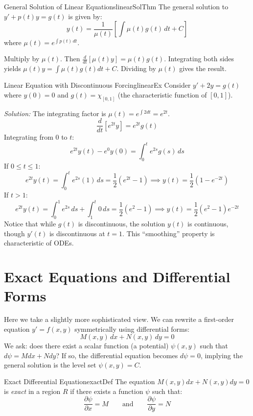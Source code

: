 \documentclass{book}
\newenvironment{Proof}[1][]
  {\begin{ProofTcb}[#1]}
  {\end{ProofTcb}}
\begin{document}
\begin{thm}{General Solution of Linear Equations}{linearSolThm}
    The general solution to $y' + p(t)y = g(t)$ is given by:
    \[
        y(t) = \frac{1}{\mu(t)} \left[ \int \mu(t)g(t) \, dt + C \right]
    \]
    where $\mu(t) = e^{\int p(t) \, dt}$.
\end{thm}

\begin{Proof}
    Multiply by $\mu(t)$. Then $\frac{d}{dt}[\mu(t)y] = \mu(t)g(t)$. Integrating both sides yields $\mu(t)y = \int \mu(t)g(t) dt + C$. Dividing by $\mu(t)$ gives the result.
\end{Proof}

\begin{example}{Linear Equation with Discontinuous Forcing}{linearEx}
    Consider $y' + 2y = g(t)$ where $y(0)=0$ and $g(t) = \chi_{[0,1]}$ (the characteristic function of $[0,1]$).

    \emph{Solution:}
    The integrating factor is $\mu(t) = e^{\int 2 dt} = e^{2t}$.
    \[
        \frac{d}{dt}[e^{2t}y] = e^{2t}g(t)
    \]
    Integrating from $0$ to $t$:
    \[
        e^{2t}y(t) - e^0y(0) = \int_0^t e^{2s}g(s) \, ds
    \]
    If $0 \le t \le 1$:
    \[
        e^{2t}y(t) = \int_0^t e^{2s}(1) \, ds = \frac{1}{2}(e^{2t}-1) \implies y(t) = \frac{1}{2}(1 - e^{-2t})
    \]
    If $t > 1$:
    \[
        e^{2t}y(t) = \int_0^1 e^{2s} \, ds + \int_1^t 0 \, ds = \frac{1}{2}(e^2 - 1) \implies y(t) = \frac{1}{2}(e^2 - 1)e^{-2t}
    \]
    Notice that while $g(t)$ is discontinuous, the solution $y(t)$ is continuous, though $y'(t)$ is discontinuous at $t=1$. This ``smoothing'' property is characteristic of ODEs.
\end{example}

\section{Exact Equations and Differential Forms}

Here we take a slightly more sophisticated view. We can rewrite a first-order equation $y' = f(x,y)$ symmetrically using differential forms:
\[
    M(x,y) \, dx + N(x,y) \, dy = 0
\]
We ask: does there exist a scalar function (a potential) $\psi(x,y)$ such that $d\psi = M dx + N dy$? If so, the differential equation becomes $d\psi = 0$, implying the general solution is the level set $\psi(x,y) = C$.

\begin{defn}{Exact Differential Equation}{exactDef}
    The equation $M(x,y)dx + N(x,y)dy = 0$ is \emph{exact} in a region $R$ if there exists a function $\psi$ such that:
    \[
        \frac{\partial \psi}{\partial x} = M \qquad \text{and} \qquad \frac{\partial \psi}{\partial y} = N
    \]
\end{defn}
\end{document}
